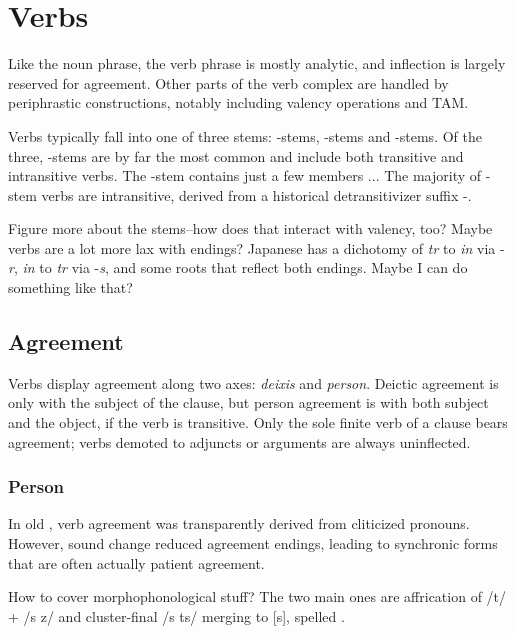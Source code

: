 \setchapterpreamble[u]{\margintoc}
\chapter{Verbs}
Like the noun phrase, the \langname{} verb phrase is mostly analytic, and inflection is largely reserved for agreement. Other parts of the verb complex are handled by periphrastic constructions, notably including valency operations and TAM.

Verbs typically fall into one of three stems: -stems, -stems and -stems. Of the three, -stems are by far the most common and include both transitive and intransitive verbs. The -stem contains just a few members ... The majority of -stem verbs are intransitive, derived from a historical detransitivizer suffix -.

\begin{kaobox}[frametitle=\sc todo:]
	Figure more about the stems--how does that interact with valency, too? Maybe verbs are a lot more lax with endings?
	Japanese has a dichotomy of \emph{tr} to \emph{in} via -\emph{r}, \emph{in} to \emph{tr} via -\emph{s}, and some roots that reflect both endings. Maybe I can do something like that?
\end{kaobox}

\section{Agreement}
Verbs display agreement along two axes: \emph{deixis} and \emph{person}. Deictic agreement is only with the subject of the clause, but person agreement is with both subject and the object, if the verb is transitive. Only the sole finite verb of a clause bears agreement; verbs demoted to adjuncts or arguments are always uninflected.

\subsection{Person}
In old \langname{}, verb agreement was transparently derived from cliticized pronouns. However, sound change reduced agreement endings, leading to synchronic forms that are often actually patient agreement.

\begin{kaobox}[frametitle=\sc todo:]
	How to cover morphophonological stuff? The two main ones are affrication of /t/ + /s z/ and cluster-final /s ts/ merging to [s], spelled .
\end{kaobox}


